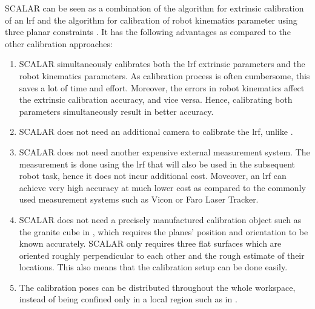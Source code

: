 SCALAR can be seen as a combination of the algorithm for extrinsic calibration of an \ac{lrf} \cite{Zhang2004} and the algorithm for calibration of robot kinematics parameter using three planar constraints \cite{Joubair2015}. It has the following advantages as compared to the other calibration approaches:
\begin{enumerate}
\item SCALAR simultaneously calibrates both the \ac{lrf} extrinsic parameters and the robot kinematics parameters. As calibration process is often cumbersome, this saves a lot of time and effort. Moreover, the errors in robot kinematics affect the extrinsic calibration accuracy, and vice versa. Hence, calibrating both parameters simultaneously result in better accuracy. 
\item SCALAR does not need an additional camera to calibrate the \ac{lrf}, unlike \cite{Zhang2004}.
\item SCALAR does not need another expensive external measurement system. The measurement is done using the \ac{lrf} that will also be used in the subsequent robot task, hence it does not incur additional cost. Moveover, an \ac{lrf} can achieve very high accuracy at much lower cost as compared to the commonly used measurement systems such as Vicon or Faro Laser Tracker. 
\item SCALAR does not need a precisely manufactured calibration object such as the granite cube in \cite{Joubair2015}, which requires the planes' position and orientation to be known accurately. SCALAR only requires
three flat surfaces which are oriented roughly perpendicular to each other and the rough estimate of their locations. This also means that the calibration setup can be done easily.
\item The calibration poses can be distributed throughout the whole workspace, instead of being confined only in a local region such as in \cite{Joubair2015}. 
\end{enumerate}



